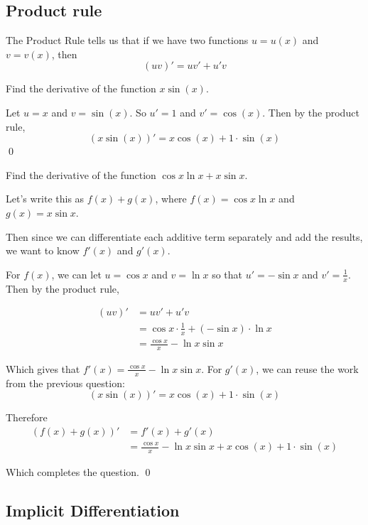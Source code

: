 \subsection{Product rule}
The Product Rule tells us that if we have two functions $u = u(x)$ and $v = v(x)$, then 
\[ (uv)' = uv' + u'v \]

\begin{example}
    Find the derivative of the function $x \sin(x)$.
\end{example}
\begin{solution}
    Let $u = x$ and $v = \sin(x)$. So $u' = 1$ and $v' = \cos(x)$. Then by the product rule,
    \[ (x\sin(x))' = x \cos (x) + 1 \cdot \sin (x) \]
    \qed
\end{solution}

\begin{example}
    Find the derivative of the function $\cos x \ln x + x \sin x$.
\end{example}
\begin{solution}
    Let's write this as $f(x) + g(x)$, where $f(x) = \cos x \ln x$ and $g(x) = x \sin x$.

    Then since we can differentiate each additive term separately and add the results, we want to know $f'(x)$ and $g'(x)$.

    For $f(x)$, we can let $u= \cos x$ and $v = \ln x$ so that $u' = -\sin x$ and $v' = \frac{1}{x}$. Then by the product rule,

    \begin{align*}
        (uv)' &= uv' + u'v \\
         &= \cos x \cdot \frac{1}{x} + (-\sin x) \cdot \ln x \\
         &= \frac{\cos x}{x} - \ln x \sin x
    \end{align*}

    Which gives that $f'(x) = \frac{\cos x}{x} - \ln x \sin x$. For $g'(x)$, we can reuse the work from the previous question:
    \[(x\sin(x))' = x \cos (x) + 1 \cdot \sin (x) \]

    Therefore 
    \begin{align*}
        (f(x) + g(x))' &= f'(x) + g'(x) \\
         &= \frac{\cos x}{x} - \ln x \sin x + x \cos (x) + 1 \cdot \sin (x) 
    \end{align*}

    Which completes the question.
    \qed
\end{solution}


\subsection{Implicit Differentiation}

